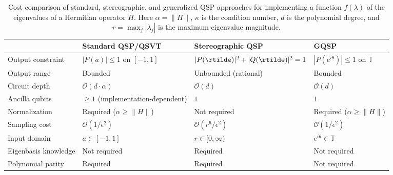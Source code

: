 \begin{table}[t]
	\caption{Cost comparison of standard, stereographic, and generalized QSP approaches for implementing a function $f(\lambda)$ of the eigenvalues of a Hermitian operator $H$. Here $\alpha = \|H\|$, $\kappa$ is the condition number, $d$ is the polynomial degree, and $r = \max_j |\lambda_j|$ is the maximum eigenvalue magnitude.}
	\label{tab:cost-comparison}
	\begin{ruledtabular}
		\begin{tabular}{llll}
			                     & Standard QSP/QSVT                   & Stereographic QSP                     & GQSP~\cite{MotlaghWiebe2023}              \\
			\hline
			Output constraint    & $|P(a)| \leq 1$ on $[-1,1]$         & $|P(\rtilde)|^2 + |Q(\rtilde)|^2 = 1$ & $|P(e^{i\theta})| \leq 1$ on $\mathbb{T}$ \\
			Output range         & Bounded                             & Unbounded (rational)                  & Bounded                                   \\
			Circuit depth        & $\mathcal{O}(d \cdot \alpha)$       & $\mathcal{O}(d)$                      & $\mathcal{O}(d)$                          \\
			Ancilla qubits       & $\geq 1$ (implementation-dependent) & $1$                                   & $1$                                       \\
			Normalization        & Required ($\alpha \geq \|H\|$)      & Not required                          & Required ($\alpha \geq \|H\|$)            \\
			Sampling cost        & $\mathcal{O}(1/\epsilon^2)$         & $\mathcal{O}(r^6/\epsilon^2)$         & $\mathcal{O}(1/\epsilon^2)$               \\
			Input domain         & $a \in [-1,1]$                      & $r \in [0,\infty)$                    & $e^{i\theta} \in \mathbb{T}$              \\
			Eigenbasis knowledge & Not required                        & Required                              & Not required                              \\
			Polynomial parity    & Required                            & Required                              & Not required                              \\
		\end{tabular}
	\end{ruledtabular}
\end{table}

